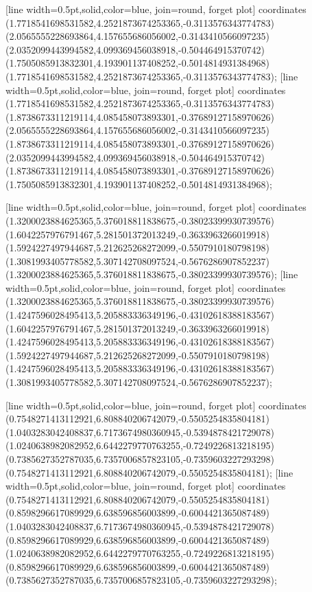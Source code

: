 [line width=0.5pt,solid,color=blue, join=round, forget plot] coordinates {(1.7718541698531582,4.2521873674253365,-0.3113576343774783) (2.0565555228693864,4.157655686056002,-0.3143410566097235) (2.0352099443994582,4.099369456038918,-0.504464915370742) (1.7505085913832301,4.193901137408252,-0.5014814931384968) (1.7718541698531582,4.2521873674253365,-0.3113576343774783)};
[line width=0.5pt,solid,color=blue, join=round, forget plot] coordinates {(1.7718541698531582,4.2521873674253365,-0.3113576343774783) (1.8738673311219114,4.085458073893301,-0.37689127158970626) (2.0565555228693864,4.157655686056002,-0.3143410566097235) (1.8738673311219114,4.085458073893301,-0.37689127158970626) (2.0352099443994582,4.099369456038918,-0.504464915370742) (1.8738673311219114,4.085458073893301,-0.37689127158970626) (1.7505085913832301,4.193901137408252,-0.5014814931384968)};

[line width=0.5pt,solid,color=blue, join=round, forget plot] coordinates {(1.3200023884625365,5.376018811838675,-0.38023399930739576) (1.6042257976791467,5.281501372013249,-0.3633963266019918) (1.5924227497944687,5.212625268272099,-0.5507910180798198) (1.3081993405778582,5.307142708097524,-0.5676286907852237) (1.3200023884625365,5.376018811838675,-0.38023399930739576)};
[line width=0.5pt,solid,color=blue, join=round, forget plot] coordinates {(1.3200023884625365,5.376018811838675,-0.38023399930739576) (1.4247596028495413,5.205883336349196,-0.43102618388183567) (1.6042257976791467,5.281501372013249,-0.3633963266019918) (1.4247596028495413,5.205883336349196,-0.43102618388183567) (1.5924227497944687,5.212625268272099,-0.5507910180798198) (1.4247596028495413,5.205883336349196,-0.43102618388183567) (1.3081993405778582,5.307142708097524,-0.5676286907852237)};

[line width=0.5pt,solid,color=blue, join=round, forget plot] coordinates {(0.7548271413112921,6.808840206742079,-0.5505254835804181) (1.0403283042408837,6.7173674980360945,-0.5394878421729078) (1.0240638982082952,6.6442279770763255,-0.7249226813218195) (0.7385627352787035,6.7357006857823105,-0.7359603227293298) (0.7548271413112921,6.808840206742079,-0.5505254835804181)};
[line width=0.5pt,solid,color=blue, join=round, forget plot] coordinates {(0.7548271413112921,6.808840206742079,-0.5505254835804181) (0.8598296617089929,6.638596856003899,-0.6004421365087489) (1.0403283042408837,6.7173674980360945,-0.5394878421729078) (0.8598296617089929,6.638596856003899,-0.6004421365087489) (1.0240638982082952,6.6442279770763255,-0.7249226813218195) (0.8598296617089929,6.638596856003899,-0.6004421365087489) (0.7385627352787035,6.7357006857823105,-0.7359603227293298)};

